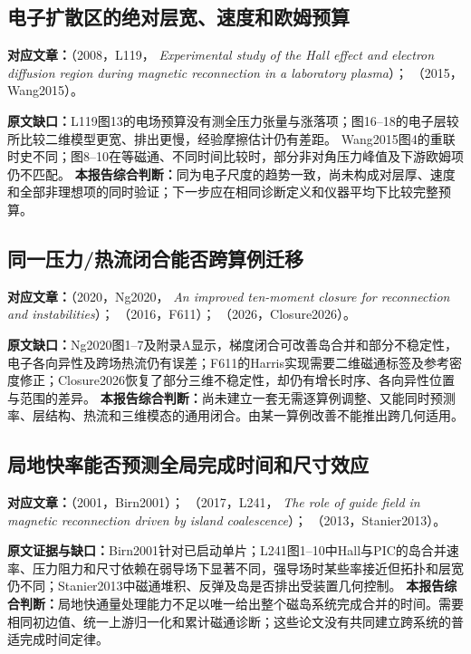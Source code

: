 \documentclass[UTF8,a4paper,11pt,openany,fontset=fandol]{ctexbook}
\begin{document}
\subsection{电子扩散区的绝对层宽、速度和欧姆预算}
\textbf{对应文章：}\citet{L119}（2008，L119，
\emph{Experimental study of the Hall effect and electron diffusion region during magnetic reconnection in a laboratory plasma}）；
\citet{Wang2015}（2015，Wang2015）。

\textbf{原文缺口：}L119图13的电场预算没有测全压力张量与涨落项；图16--18的电子层较所比较二维模型更宽、排出更慢，经验摩擦估计仍有差距。
Wang2015图4的重联时史不同；图8--10在等磁通、不同时间比较时，部分非对角压力峰值及下游欧姆项仍不匹配。
\textbf{本报告综合判断：}同为电子尺度的趋势一致，尚未构成对层厚、速度和全部非理想项的同时验证；下一步应在相同诊断定义和仪器平均下比较完整预算。

\subsection{同一压力/热流闭合能否跨算例迁移}
\textbf{对应文章：}\citet{Ng2020}（2020，Ng2020，
\emph{An improved ten-moment closure for reconnection and instabilities}）；
\citet{F611}（2016，F611）；
\citet{Closure2026}（2026，Closure2026）。

\textbf{原文缺口：}Ng2020图1--7及附录A显示，梯度闭合可改善岛合并和部分不稳定性，电子各向异性及跨场热流仍有误差；F611的Harris实现需要二维磁通标签及参考密度修正；Closure2026恢复了部分三维不稳定性，却仍有增长时序、各向异性位置与范围的差异。
\textbf{本报告综合判断：}尚未建立一套无需逐算例调整、又能同时预测率、层结构、热流和三维模态的通用闭合。由某一算例改善不能推出跨几何适用。

\subsection{局地快率能否预测全局完成时间和尺寸效应}
\textbf{对应文章：}\citet{Birn2001}（2001，Birn2001）；
\citet{L241}（2017，L241，
\emph{The role of guide field in magnetic reconnection driven by island coalescence}）；
\citet{Stanier2013}（2013，Stanier2013）。

\textbf{原文证据与缺口：}Birn2001针对已启动单片；L241图1--10中Hall与PIC的岛合并速率、压力阻力和尺寸依赖在弱导场下显著不同，强导场时某些率接近但拓扑和层宽仍不同；Stanier2013中磁通堆积、反弹及岛是否排出受装置几何控制。
\textbf{本报告综合判断：}局地快通量处理能力不足以唯一给出整个磁岛系统完成合并的时间。需要相同初边值、统一上游归一化和累计磁通诊断；这些论文没有共同建立跨系统的普适完成时间定律。
\end{document}
